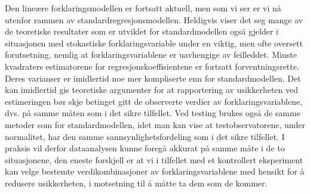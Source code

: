 Den lineære forklaringsmodellen er fortsatt aktuell, men som vi ser er
vi nå utenfor rammen av standardregresjonsmodellen.  Heldigvis viser det
seg mange av de teoretiske resultater som er utviklet for 
standard\-mo\-dellen også gjelder i situasjonen med stokastiske
forklaringsvariable under en viktig, men ofte oversett forutsetning, nemlig
at forklaringsvariablene er uavhengige av feilleddet.  Minste kvadraters
estimatorene for regresjons\-koeffisientene er fortsatt forventningsrette.
Deres varianser er imidlertid noe mer kompliserte enn for
standardmodellen.  Det kan imidlertid gis teoretiske argumenter for at
rapportering av usikkerheten ved estimeringen bør skje betinget gitt
de observerte verdier av forklaringsvariablene, dvs. på samme måten
som i det sikre tilfellet.  Ved testing brukes også de samme metoder som
for standardmodellen, idet man kan vise at testobservatorene, under
normalitet, har den samme sannsynlighetsfordeling som i det sikre tilfellet.
I praksis vil derfor dataanalysen kunne foregå akkurat på samme 
måte i de to situasjonene, den eneste forskjell er at vi i tilfellet
med et kontrollert eksperiment kan velge bestemte verdikombinasjoner av
forklaringsvariablene med hensikt for å redusere usikkerheten, i
motsetning til å måtte ta dem som de kommer.\\

